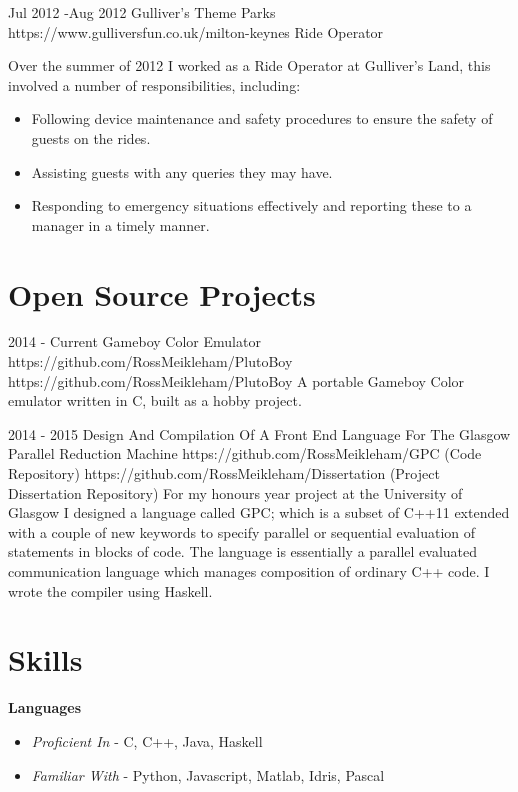 \documentclass[10pt]{article} %
\begin{document}
\job
{Jul 2012 -}{Aug 2012}
{Gulliver's Theme Parks}
{https://www.gulliversfun.co.uk/milton-keynes}
{Ride Operator}
{Over the summer of 2012 I worked as a Ride Operator at Gulliver's Land, this involved a number of responsibilities, including: 
\begin{itemize}[noitemsep]
\item{Following device maintenance and safety procedures to ensure the safety of guests on the rides.}
\item{Assisting guests with any queries they may have.}
\item{Responding to emergency situations effectively and reporting these to a manager in a timely manner.}
\end{itemize}
}



\section{Open Source Projects}
\job
{2014 - }{Current}
{Gameboy Color Emulator}
{https://github.com/RossMeikleham/PlutoBoy}
{https://github.com/RossMeikleham/PlutoBoy}
{A portable Gameboy Color emulator written in C, built as a hobby project.} 


\jobtwo
{2014 - }{2015}
{Design And Compilation Of A Front End Language For The Glasgow Parallel Reduction Machine}
{}
{https://github.com/RossMeikleham/GPC (Code Repository)}
{https://github.com/RossMeikleham/Dissertation (Project Dissertation Repository)}
{For my honours year project at the University of Glasgow I designed a language called GPC; which is a subset of C++11 extended with a couple of new keywords to specify parallel or sequential evaluation of statements in blocks of code. The language is essentially a parallel evaluated communication language which manages composition of ordinary C++ code. I wrote the compiler using Haskell.}



\section{Skills}
\bf{Languages}
\begin{itemize}
\item \textit{Proficient In} - C, C++, Java, Haskell
\item \textit{Familiar With}  - Python, Javascript, Matlab, Idris, Pascal
\end{itemize}
\end{document}
